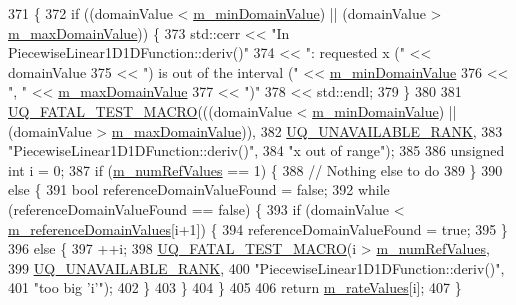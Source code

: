 \begin{DoxyCode}
371 \{
372   \textcolor{keywordflow}{if} ((domainValue < \hyperlink{class_q_u_e_s_o_1_1_base1_d1_d_function_a7b18b3854ee74ef5befbc67b75ebbdc5}{m\_minDomainValue}) || (domainValue > 
      \hyperlink{class_q_u_e_s_o_1_1_base1_d1_d_function_aa0025999ccab2145cd46c0a81e260e8f}{m\_maxDomainValue})) \{
373     std::cerr << \textcolor{stringliteral}{"In PiecewiseLinear1D1DFunction::deriv()"}
374               << \textcolor{stringliteral}{": requested x ("}            << domainValue
375               << \textcolor{stringliteral}{") is out of the interval ("} << \hyperlink{class_q_u_e_s_o_1_1_base1_d1_d_function_a7b18b3854ee74ef5befbc67b75ebbdc5}{m\_minDomainValue}
376               << \textcolor{stringliteral}{", "}                         << \hyperlink{class_q_u_e_s_o_1_1_base1_d1_d_function_aa0025999ccab2145cd46c0a81e260e8f}{m\_maxDomainValue}
377               << \textcolor{stringliteral}{")"}
378               << std::endl;
379   \}
380 
381   \hyperlink{_defines_8h_a56d63d18d0a6d45757de47fcc06f574d}{UQ\_FATAL\_TEST\_MACRO}(((domainValue < \hyperlink{class_q_u_e_s_o_1_1_base1_d1_d_function_a7b18b3854ee74ef5befbc67b75ebbdc5}{m\_minDomainValue}) || (domainValue 
      > \hyperlink{class_q_u_e_s_o_1_1_base1_d1_d_function_aa0025999ccab2145cd46c0a81e260e8f}{m\_maxDomainValue})),
382                       \hyperlink{namespace_q_u_e_s_o_a7d4679800a430ae8e473c1c7bc0bfb21}{UQ\_UNAVAILABLE\_RANK},
383                       \textcolor{stringliteral}{"PiecewiseLinear1D1DFunction::deriv()"},
384                       \textcolor{stringliteral}{"x out of range"});
385 
386   \textcolor{keywordtype}{unsigned} \textcolor{keywordtype}{int} i = 0;
387   \textcolor{keywordflow}{if} (\hyperlink{class_q_u_e_s_o_1_1_piecewise_linear1_d1_d_function_a1ff5c7e5243f6a763409a68e86681129}{m\_numRefValues} == 1) \{
388     \textcolor{comment}{// Nothing else to do}
389   \}
390   \textcolor{keywordflow}{else} \{
391     \textcolor{keywordtype}{bool} referenceDomainValueFound = \textcolor{keyword}{false};
392     \textcolor{keywordflow}{while} (referenceDomainValueFound == \textcolor{keyword}{false}) \{
393       \textcolor{keywordflow}{if} (domainValue < \hyperlink{class_q_u_e_s_o_1_1_piecewise_linear1_d1_d_function_abda9e4143096bf0bf935b7c9173aa2cc}{m\_referenceDomainValues}[i+1]) \{
394         referenceDomainValueFound = \textcolor{keyword}{true};
395       \}
396       \textcolor{keywordflow}{else} \{
397         ++i;
398         \hyperlink{_defines_8h_a56d63d18d0a6d45757de47fcc06f574d}{UQ\_FATAL\_TEST\_MACRO}(i > \hyperlink{class_q_u_e_s_o_1_1_piecewise_linear1_d1_d_function_a1ff5c7e5243f6a763409a68e86681129}{m\_numRefValues},
399                             \hyperlink{namespace_q_u_e_s_o_a7d4679800a430ae8e473c1c7bc0bfb21}{UQ\_UNAVAILABLE\_RANK},
400                            \textcolor{stringliteral}{"PiecewiseLinear1D1DFunction::deriv()"},
401                            \textcolor{stringliteral}{"too big 'i'"});
402       \}
403     \}
404   \}
405 
406   \textcolor{keywordflow}{return} \hyperlink{class_q_u_e_s_o_1_1_piecewise_linear1_d1_d_function_aef7d37fe499c0e8f3bb6261f1b4e8147}{m\_rateValues}[i];
407 \}
\end{DoxyCode}
